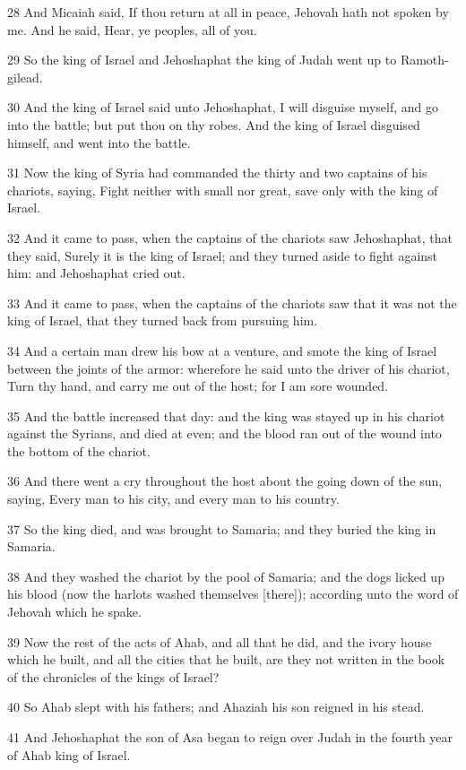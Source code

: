\par 28 And Micaiah said, If thou return at all in peace, Jehovah hath not spoken by me. And he said, Hear, ye peoples, all of you.
\par 29 So the king of Israel and Jehoshaphat the king of Judah went up to Ramoth-gilead.
\par 30 And the king of Israel said unto Jehoshaphat, I will disguise myself, and go into the battle; but put thou on thy robes. And the king of Israel disguised himself, and went into the battle.
\par 31 Now the king of Syria had commanded the thirty and two captains of his chariots, saying, Fight neither with small nor great, save only with the king of Israel.
\par 32 And it came to pass, when the captains of the chariots saw Jehoshaphat, that they said, Surely it is the king of Israel; and they turned aside to fight against him: and Jehoshaphat cried out.
\par 33 And it came to pass, when the captains of the chariots saw that it was not the king of Israel, that they turned back from pursuing him.
\par 34 And a certain man drew his bow at a venture, and smote the king of Israel between the joints of the armor: wherefore he said unto the driver of his chariot, Turn thy hand, and carry me out of the host; for I am sore wounded.
\par 35 And the battle increased that day: and the king was stayed up in his chariot against the Syrians, and died at even; and the blood ran out of the wound into the bottom of the chariot.
\par 36 And there went a cry throughout the host about the going down of the sun, saying, Every man to his city, and every man to his country.
\par 37 So the king died, and was brought to Samaria; and they buried the king in Samaria.
\par 38 And they washed the chariot by the pool of Samaria; and the dogs licked up his blood (now the harlots washed themselves [there]); according unto the word of Jehovah which he spake.
\par 39 Now the rest of the acts of Ahab, and all that he did, and the ivory house which he built, and all the cities that he built, are they not written in the book of the chronicles of the kings of Israel?
\par 40 So Ahab slept with his fathers; and Ahaziah his son reigned in his stead.
\par 41 And Jehoshaphat the son of Asa began to reign over Judah in the fourth year of Ahab king of Israel.
